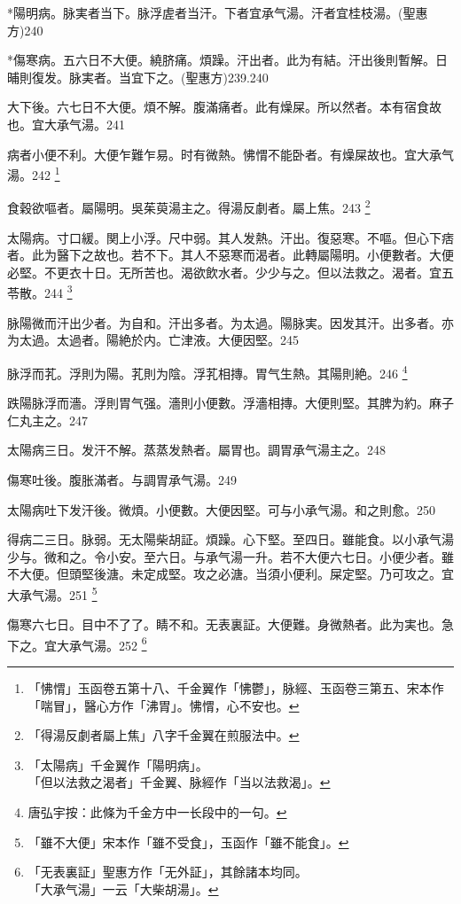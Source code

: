 \documentclass[b5paper,twoside,zihao=-4,UTF8]{ctexbook}
\begin{document}
*陽明病。脉実者当下。脉浮虗者当汗。下者宜承气湯。汗者宜桂枝湯。(聖惠方)240

*傷寒病。五六日不大便。繞脐痛。煩躁。汗出者。此为有結。汗出後則暫解。日晡則復发。脉実者。当宜下之。(聖惠方)239.240

大下後。六七日不大便。煩不解。腹滿痛者。此有燥屎。所以然者。本有宿食故也。宜{大}承气湯。241

病者小便不利。大便乍難乍易。时有微熱。怫㥜不能卧者。有燥屎故也。宜{大}承气湯。242
	\footnote{「怫㥜」玉函卷五第十八、千金翼作「怫鬱」，脉經、玉函卷三第五、宋本作「喘冒」，醫心方作「沸胃」。怫㥜，心不安也。}

食穀欲嘔者。屬陽明。{吳}茱萸湯主之。得湯反劇者。屬上焦。243
	\footnote{「得湯反劇者屬上焦」八字千金翼在煎服法中。}

太陽病。寸{口}緩。関{上小}浮。尺{中}弱。其人发熱。汗出。復惡寒。不嘔。但心下痞者。此为醫下之故也。若不下。其人不惡寒而渴者。此轉屬陽明。小便數者。大便必堅。不更衣十日。无所苦也。{渴}欲飲水者。少少与之。但以法救之。渴者。宜五苓散。244
	\footnote{「太陽病」千金翼作「陽明病」。\\「但以法救之渴者」千金翼、脉經作「当以法救渴」。}

脉陽微而汗出少者。为自和。汗出多者。为太過。陽脉実。因发其汗。出多者。亦为太過。太過者。陽絶於内。亡津液。大便因堅。245

脉浮而芤。浮則为陽。芤則为陰。浮芤相摶。胃气生熱。其陽則絶。246
	\footnote{唐弘宇按：此條为千金方中一长段中的一句。}

跌陽脉浮而濇。浮則胃气强。濇則小便數。浮濇相摶。大便則堅。其脾为約。麻子仁丸主之。247

太陽病三日。发汗不解。蒸蒸发熱者。屬胃也。{調胃}承气湯主之。248

傷寒吐後。腹胀滿者。与{調胃}承气湯。249

太陽病吐下发汗後。微煩。小便數。大便因堅。可与小承气湯。和之則愈。250

得病二三日。脉弱。无太陽柴胡証。煩躁。心下堅。至四日。雖能食。以{小}承气湯少与。微和之。令小安。至六日。与承气湯一升。若不大便六七日。小便少者。雖不大便。但頭堅後溏。未定成堅。攻之必溏。当須小便利。屎定堅。乃可攻之。宜{大}承气湯。251
	\footnote{「雖不大便」宋本作「雖不受食」，玉函作「雖不能食」。}

傷寒六七日。目中不了了。睛不和。无表{裏}証。大便難。身微熱者。此为実也。急下之。宜{大}承气湯。252
	\footnote{「无表裏証」聖惠方作「无外証」，其餘諸本均同。\\「大承气湯」一云「大柴胡湯」。}
\end{document}
